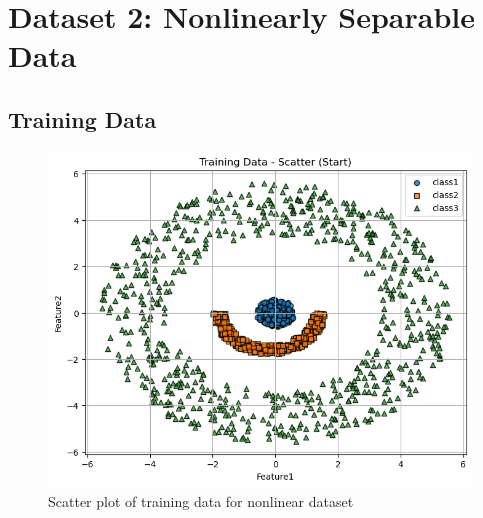 \documentclass[12pt,a4paper]{article}
\begin{document}





\section{Dataset 2: Nonlinearly Separable Data}
\subsection{Training Data}
\begin{figure}[H]
    \centering
    \includegraphics[width=\linewidth]{images/NLS_Group04_images/01_training data_scatter.png}
    \caption{Scatter plot of training data for nonlinear dataset}
\end{figure}
\end{document}
